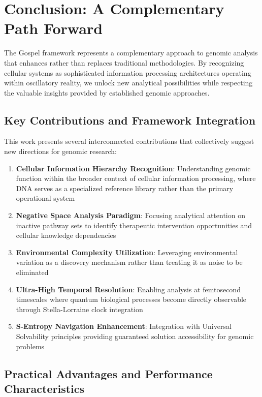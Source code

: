 \documentclass[12pt,a4paper]{article}
\begin{document}
\section{Conclusion: A Complementary Path Forward}

The Gospel framework represents a complementary approach to genomic analysis that enhances rather than replaces traditional methodologies. By recognizing cellular systems as sophisticated information processing architectures operating within oscillatory reality, we unlock new analytical possibilities while respecting the valuable insights provided by established genomic approaches.

\subsection{Key Contributions and Framework Integration}

This work presents several interconnected contributions that collectively suggest new directions for genomic research:

\begin{enumerate}
\item \textbf{Cellular Information Hierarchy Recognition}: Understanding genomic function within the broader context of cellular information processing, where DNA serves as a specialized reference library rather than the primary operational system
\item \textbf{Negative Space Analysis Paradigm}: Focusing analytical attention on inactive pathway sets to identify therapeutic intervention opportunities and cellular knowledge dependencies
\item \textbf{Environmental Complexity Utilization}: Leveraging environmental variation as a discovery mechanism rather than treating it as noise to be eliminated
\item \textbf{Ultra-High Temporal Resolution}: Enabling analysis at femtosecond timescales where quantum biological processes become directly observable through Stella-Lorraine clock integration
\item \textbf{S-Entropy Navigation Enhancement}: Integration with Universal Solvability principles providing guaranteed solution accessibility for genomic problems
\end{enumerate}

\subsection{Practical Advantages and Performance Characteristics}
\end{document}
